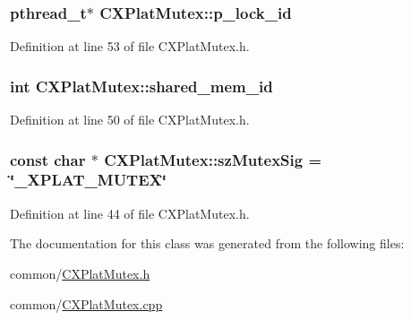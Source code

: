 \hypertarget{class_c_x_plat_mutex_ae7191ff25f679a8ea9d29322697d8f6c}{
\subsubsection[{p\-\_\-lock\-\_\-id}]{\setlength{\rightskip}{0pt plus 5cm}pthread\-\_\-t$\ast$ {\bf \-C\-X\-Plat\-Mutex\-::p\-\_\-lock\-\_\-id}}}\label{class_c_x_plat_mutex_ae7191ff25f679a8ea9d29322697d8f6c}


\-Definition at line 53 of file \-C\-X\-Plat\-Mutex.\-h.

\hypertarget{class_c_x_plat_mutex_ab29172075e4697ebb5250c51a49bd1c1}{
\subsubsection[{shared\-\_\-mem\-\_\-id}]{\setlength{\rightskip}{0pt plus 5cm}int {\bf \-C\-X\-Plat\-Mutex\-::shared\-\_\-mem\-\_\-id}}}\label{class_c_x_plat_mutex_ab29172075e4697ebb5250c51a49bd1c1}


\-Definition at line 50 of file \-C\-X\-Plat\-Mutex.\-h.

\hypertarget{class_c_x_plat_mutex_a495937d1eecf5be5943f7127f5984019}{
\subsubsection[{sz\-Mutex\-Sig}]{\setlength{\rightskip}{0pt plus 5cm}const char $\ast$ {\bf \-C\-X\-Plat\-Mutex\-::sz\-Mutex\-Sig} = \char`\"{}\-\_\-\-X\-P\-L\-A\-T\-\_\-\-M\-U\-T\-E\-X\char`\"{}}}\label{class_c_x_plat_mutex_a495937d1eecf5be5943f7127f5984019}


\-Definition at line 44 of file \-C\-X\-Plat\-Mutex.\-h.



\-The documentation for this class was generated from the following files\-:\begin{DoxyCompactItemize}
\item 
common/\hyperlink{_c_x_plat_mutex_8h}{\-C\-X\-Plat\-Mutex.\-h}\item 
common/\hyperlink{_c_x_plat_mutex_8cpp}{\-C\-X\-Plat\-Mutex.\-cpp}\end{DoxyCompactItemize}
